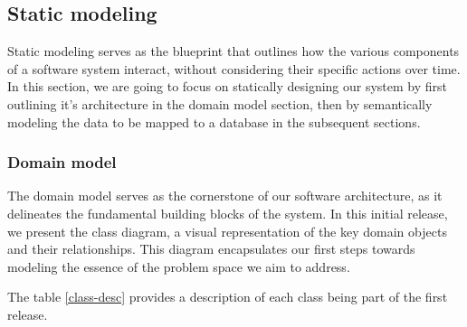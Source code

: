 \subsection{Static modeling}
Static modeling serves as the blueprint that outlines how the various components of a software system
interact, without considering their specific actions over time. In this section, we are going to focus
on statically designing our system by first outlining it's architecture in the domain model section, then
by semantically modeling the data to be mapped to a database in the subsequent sections.

\subsubsection{Domain model}
The domain model serves as the cornerstone of our software architecture, as it delineates the fundamental
building blocks of the system. In this initial release, we present the class diagram, a visual representation
of the key domain objects and their relationships. This diagram encapsulates our first steps towards modeling
the essence of the problem space we aim to address.

\noindent The table \ref{class-desc} provides a description of each class being part of the first release. \\

